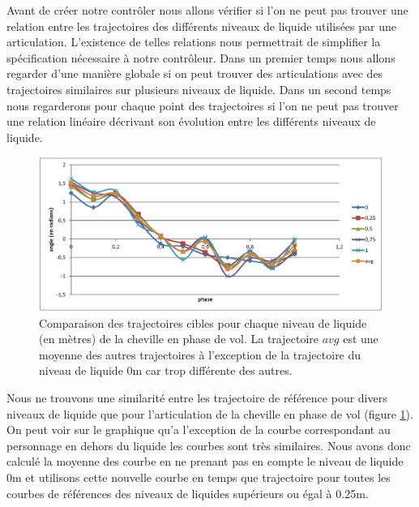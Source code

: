 \documentclass[runningheads,a4paper]{llncs}
\begin{document}
Avant de créer notre contrôler nous allons vérifier si l'on ne peut pas trouver une relation entre les trajectoires des différents niveaux de liquide utilisées par une articulation. L'existence de telles relations nous permettrait de simplifier la spécification nécessaire à notre contrôleur. Dans un premier temps nous allons regarder d'une manière globale si on peut trouver des articulations avec des trajectoires similaires sur plusieurs niveaux de liquide. Dans un second temps nous regarderons pour chaque point des trajectoires si l'on ne peut pas trouver une relation linéaire décrivant son évolution entre les différents niveaux de liquide.

\begin{figure}[h]
\centering
\includegraphics[scale=0.35]{trajs_swing_ankle.png}
\caption{Comparaison des trajectoires cibles pour chaque niveau de liquide (en mètres) de la cheville en phase de vol. La trajectoire $avg$ est une moyenne des autres trajectoires à l'exception de la trajectoire du niveau de liquide 0m car trop différente des autres.}
\label{fig:comp_traj_swing_foot}
\end{figure}

Nous ne trouvons une similarité entre les trajectoire de référence pour divers niveaux de liquide que pour l'articulation de la cheville en phase de vol (figure \ref{fig:comp_traj_swing_foot}). On peut voir sur le graphique qu'a l'exception de la courbe correspondant au personnage en dehors du liquide les courbes sont très similaires. Nous avons donc calculé la moyenne des courbe en ne prenant pas en compte le niveau de liquide 0m et utilisons cette nouvelle courbe en temps que trajectoire pour toutes les courbes de références des niveaux de liquides supérieurs ou égal à 0.25m. 
\end{document}
